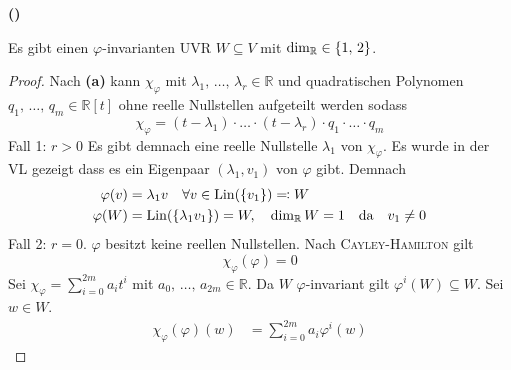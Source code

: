 \documentclass[a4paper, 12pt]{scrartcl}
\newcounter{taski}
\newcounter{taskii}[taski]
\newcommand{\ttask}{\stepcounter{taskii}\textbf{(\alph{taskii})}~}
\DeclareMathOperator*{\Lin}{Lin}
\begin{document}
\ttask
\begin{theorem}
    Es gibt einen $\varphi$-invarianten UVR $W \subseteq V$ mit $\dim_{\mathbb{R}} \in \qty{1,\,2}$.
\end{theorem}
\begin{proof} Nach \textbf{(a)} kann $\chi_\varphi$ mit $\lambda_1,\,\dots,\,\lambda_r \in \mathbb{R}$ und quadratischen Polynomen $q_1,\,\dots,\,q_m \in \mathbb{R}[t]$ ohne reelle Nullstellen aufgeteilt werden sodass
\[ \chi_\varphi = (t-\lambda_1) \cdot \hdots \cdot (t-\lambda_r) \cdot q_1 \cdot \hdots \cdot q_m \]
Fall 1: $r > 0$ Es gibt demnach eine reelle Nullstelle $\lambda_1$ von $\chi_\varphi$. Es wurde in der VL gezeigt dass es ein Eigenpaar $(\lambda_1, v_1)$ von $\varphi$ gibt. Demnach 
\begin{align*}
    \varphi(v) &= \lambda_1 v \quad \forall v \in \Lin(\qty{v_1}) \eqqcolon W\\
    \varphi(W) &= \Lin(\qty{\lambda_1v_1}) = W\qc \dim_{\mathbb{R}}W = 1 \qq{da} v_1 \neq 0
\end{align*}
Fall 2: $r = 0$. $\varphi$ besitzt keine reellen Nullstellen. Nach \textsc{Cayley-Hamilton} gilt
\[ \chi_\varphi(\varphi) = 0 \]
Sei $\chi_\varphi = \sum_{i=0}^{2m} a_i t^i$ mit $a_0,\,\dots,\,a_{2m} \in \mathbb{R}$. Da $W$ $\varphi$-invariant gilt $\varphi^i(W) \subseteq W$. Sei $w \in W$.
\begin{align*}
    \chi_\varphi(\varphi)(w) &= \sum_{i=0}^{2m} a_i \varphi^i(w)
\end{align*}
\end{proof}
\end{document}
